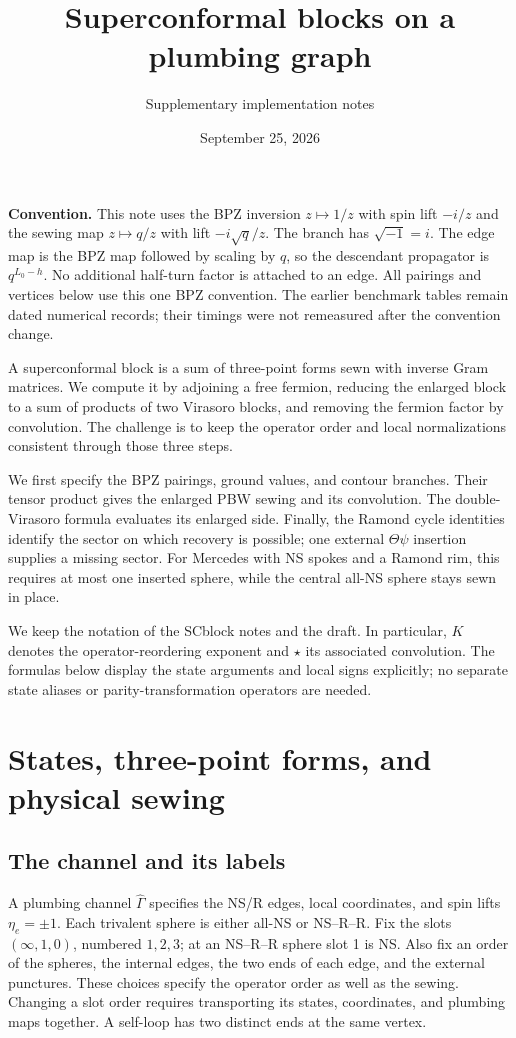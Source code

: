 \documentclass[11pt]{article}
\title{Superconformal blocks on a plumbing graph}
\author{Supplementary implementation notes}
\date{September 25, 2026}
\numberwithin{equation}{section}
\begin{document}
\maketitle

\noindent\textbf{Convention.}
This note uses the BPZ inversion $z\mapsto1/z$ with spin lift $-i/z$
and the sewing map $z\mapsto q/z$ with lift $-i\sqrt q/z$.
The branch has $\sqrt{-1}=i$. The edge map is the BPZ map followed
by scaling by $q$, so the descendant propagator is $q^{L_0-h}$.
No additional half-turn factor is attached to an edge. All pairings
and vertices below use this one BPZ convention.
The earlier benchmark tables remain dated numerical records; their
timings were not remeasured after the convention change.

A superconformal block is a sum of three-point forms sewn with inverse
Gram matrices. We compute it by adjoining a free fermion, reducing the
enlarged block to a sum of products of two Virasoro blocks, and removing
the fermion factor by convolution. The challenge is to keep the operator order and local
normalizations consistent through those three steps.

We first specify the BPZ pairings, ground values, and contour branches.
Their tensor product gives the enlarged PBW sewing and its convolution. The double-Virasoro formula evaluates its enlarged side.
Finally, the Ramond cycle identities identify the sector on which recovery
is possible; one external $\Theta\psi$ insertion supplies a missing sector.
For Mercedes with NS spokes and a Ramond rim, this requires at most one
inserted sphere, while the central all-NS sphere stays sewn in place.

We keep the notation of the SCblock notes and the draft. In particular,
$K$ denotes the operator-reordering exponent and $\star$ its associated
convolution. The formulas below display the state arguments and local
signs explicitly; no separate state aliases or parity-transformation
operators are needed.

\section{States, three-point forms, and physical sewing}

\subsection{The channel and its labels}

A plumbing channel $\hat\Gamma$ specifies the NS/R edges, local coordinates,
and spin lifts $\eta_e=\pm1$. Each trivalent sphere is either all-NS or
NS--R--R. Fix the slots $(\infty,1,0)$, numbered $1,2,3$; at an NS--R--R
sphere slot 1 is NS. Also fix an order of the spheres, the internal edges,
the two ends of each edge, and the external punctures. These choices
specify the operator order as well as the sewing. Changing a slot order
requires transporting its states, coordinates, and plumbing maps together.
A self-loop has two distinct ends at the same vertex.
\end{document}
